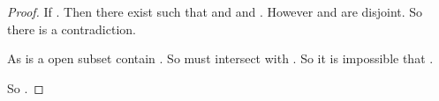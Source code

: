 \begin{enumerate}
\begin{proof}
            If . Then there exist  such that  and  and . However  and  are disjoint. So there is a contradiction.

            As  is a open subset contain . So  must intersect with . So it is impossible that .

            So .
      \end{proof}
\end{enumerate}